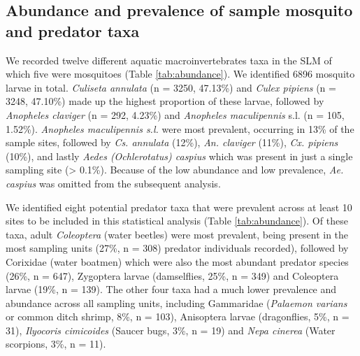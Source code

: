 \documentclass[lineno,sn-basic]{sn-jnl}%
\begin{document}
\subsection{Abundance and prevalence of sample mosquito and predator taxa}
We recorded twelve different aquatic macroinvertebrates taxa in the SLM of which five were mosquitoes (Table \ref{tab:abundance}). We identified 6896 mosquito larvae in total. \textit{Culiseta annulata} (n = 3250, 47.13\%) and \textit{Culex pipiens} (n = 3248, 47.10\%) made up the highest proportion of these larvae, followed by \textit{Anopheles claviger} (n = 292, 4.23\%) and \textit{Anopheles maculipennis} s.l. (n = 105, 1.52\%). \textit{Anopheles maculipennis s.l.} were most prevalent, occurring in 13\% of the sample sites, followed by \textit{Cs. annulata} (12\%), \textit{An. claviger} (11\%), \textit{Cx. pipiens} (10\%), and lastly \textit{Aedes (Ochlerotatus) caspius} which was present in just a single sampling site (> 0.1\%). Because of the low abundance and low prevalence, \textit{Ae. caspius} was omitted from the subsequent analysis.

We identified eight potential predator taxa that were prevalent across at least 10 sites to be included in this statistical analysis (Table \ref{tab:abundance}). Of these taxa, adult \textit{Coleoptera} (water beetles) were most prevalent, being present in the most sampling units (27\%, n = 308) predator individuals recorded), followed by Corixidae (water boatmen) which were also the most abundant predator species (26\%, n = 647), Zygoptera larvae (damselflies, 25\%, n = 349) and Coleoptera larvae (19\%, n = 139). The other four taxa had a much lower prevalence and abundance across all sampling units, including Gammaridae (\textit{Palaemon varians} or common ditch shrimp, 8\%, n = 103), Anisoptera larvae (dragonflies, 5\%, n = 31), \textit{Ilyocoris cimicoides} (Saucer bugs, 3\%, n = 19) and \textit{Nepa cinerea} (Water scorpions, 3\%, n = 11).
\end{document}
